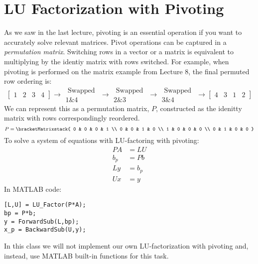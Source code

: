 \section{LU Factorization with Pivoting}
As we saw in the last lecture, pivoting is an essential operation if you want to accurately solve relevant matrices. Pivot operations can be captured in a \emph{permutation matrix}.  Switching rows in a vector or a matrix is equivalent to multiplying by the identiy matrix with rows switched.  For example, when pivoting is performed on the matrix example from Lecture 8, the final permuted row ordering is: 
\begin{equation*}
\left[ \begin{matrix} 1 & 2 & 3 & 4 \end{matrix} \right] \rightarrow \substack{\text{ Swapped } \\ \text{1\&4}} \rightarrow \substack{\text{ Swapped } \\ \text{2\&3}} \rightarrow \substack{\text{ Swapped } \\ \text{3\&4}} \rightarrow \left[\begin{matrix}4 & 3 & 1 & 2 \end{matrix} \right]
\end{equation*}
We can represent this as a permutation matrix, $P$, constructed as the idenitty matrix with rows correspondingly reordered.
\begin{equation*}
P = 
\bracketMatrixstack{
0 & 0 & 0 & 1 \\
0 & 0 & 1 & 0 \\
1 & 0 & 0 & 0 \\
0 & 1 & 0 & 0
}
\end{equation*}
To solve a system of equations with LU-factoring with pivoting:
\begin{align*}
PA &= LU \\
b_p &= Pb \\
Ly &= b_p \\
Ux &= y
\end{align*}
In MATLAB code:
\begin{lstlisting}[style=myMatlab]
[L,U] = LU_Factor(P*A);
bp = P*b;
y = ForwardSub(L,bp);
x_p = BackwardSub(U,y);
\end{lstlisting}
In this class we will not implement our own LU-factorization with pivoting and, instead, use MATLAB built-in functions for this task.
